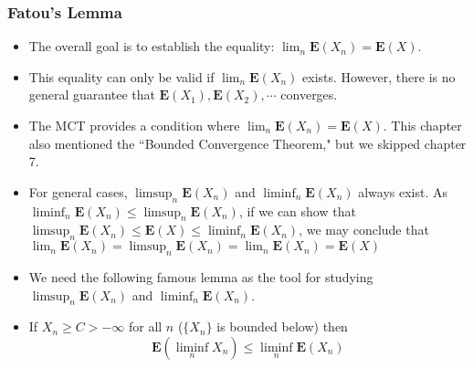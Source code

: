 \documentclass[handout]{beamer}
\newcommand{\BE}{\mathbf{E}}
\begin{document}
\frame
{
  \frametitle{Fatou's Lemma} 

   \begin{itemize}
   
             \item<1->  The overall goal is  to establish the equality: $\lim_n \BE(X_n)=\BE(X)$. 
             
             \item<2-> This equality can only be valid if $\lim_n \BE(X_n)$ exists. However, there is no general guarantee that $\BE(X_1), \BE(X_2), \cdots$ converges. 
             
                   \item<3-> The MCT provides a condition where $\lim_n \BE(X_n)=\BE(X)$. This chapter also mentioned the ``Bounded Convergence Theorem," but we skipped chapter 7. 
                  

\item<4-> For general cases, $\limsup_n \BE(X_n)$ and $\liminf_n \BE(X_n)$  always exist. As $\liminf_n \BE(X_n) \leq \limsup_n \BE(X_n)$, if we can show that $\limsup_n \BE(X_n)\leq \BE(X)\leq  \liminf_n \BE(X_n)$, we may conclude that  $\lim_n \BE(X_n)=\limsup_n \BE(X_n)=\lim_n\BE(X_n)=\BE(X)$
                     
            
                     \item<5-> We need the following famous lemma as the tool for studying $\limsup_n \BE(X_n)$ and $\liminf_n \BE(X_n)$.
     
  
                \item<6->[] \begin{Theorem} If $X_n\geq C>-\infty$ for all $n$ ($\{X_n\}$ is bounded below) then 
                $$\BE(\liminf_n X_n)\leq \liminf_n \BE(X_n) $$ \end{Theorem}

                                            \end{itemize}
}
\end{document}
